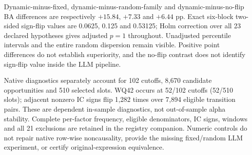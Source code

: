 Dynamic-minus-fixed, dynamic-minus-random-family and dynamic-minus-no-flip BA differences are respectively $+15.84$, $+7.33$ and $+6.44$ pp. Exact six-block two-sided sign-flip values are 0.0625, 0.125 and 0.53125; Holm correction over all 23 declared hypotheses gives adjusted $p=1$ throughout. Unadjusted percentile intervals and the entire random dispersion remain visible. Positive point differences do not establish superiority, and the no-flip contrast does not identify sign-flip value inside the LLM pipeline.

Native diagnostics separately account for 102 cutoffs, 8,670 candidate opportunities and 510 selected slots. WQ42 occurs at 52/102 cutoffs (52/510 slots); adjacent nonzero IC signs flip 1,282 times over 7,894 eligible transition pairs. These are dependent in-sample diagnostics, not out-of-sample alpha stability. Complete per-factor frequency, eligible denominators, IC signs, windows and all 21 exclusions are retained in the registry companion. Numeric controls do not repair native row-wise noncausality, provide the missing fixed/random LLM experiment, or certify original-expression equivalence.

